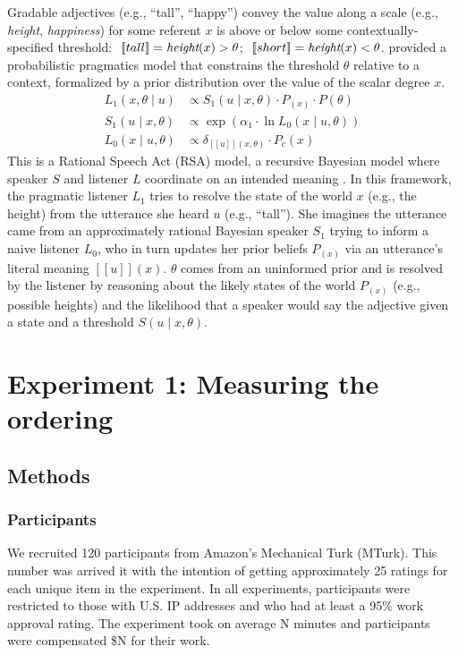 \documentclass[10pt,letterpaper]{article}
\newcommand{\denote}[1]{\mbox{ $[\![ #1 ]\!]$}}
\begin{document}
Gradable adjectives (e.g., ``tall'', ``happy'') convey the value along a scale (e.g., \emph{height}, \emph{happiness}) for some referent $x$ is above or below some contextually-specified threshold: $\denote{tall} = \emph{height}(x) > \theta$; $\denote{short} = \emph{height}(x) < \theta$.
 provided a probabilistic pragmatics model that constrains the threshold $\theta$ relative to a context, formalized by a prior distribution over the value of the scalar degree $x$.  
%
\begin{align}
L_{1}(x, \theta \mid u) &\propto S_{1}(u \mid x, \theta) \cdot P_(x) \cdot P(\theta) \label{eq:L1} \\
S_{1}(u \mid x, \theta) &\propto \exp{(\alpha_1 \cdot \ln {L_{0}(x \mid u, \theta)})} \label{eq:S1}\\
L_{0}(x \mid u, \theta) &\propto {\delta_{[\![u]\!](x, \theta)} \cdot P_{c}(x)} \label{eq:L0}
\end{align}
%
This is a Rational Speech Act (RSA) model, a recursive Bayesian model where speaker $S$ and listener $L$ coordinate on an intended meaning \cite<for a review, see >{Goodman2016:RSA}.
In this framework, the pragmatic listener $L_1$ tries to resolve the state of the world $x$ (e.g., the height) from the utterance she heard $u$ (e.g., ``tall'').
She imagines the utterance came from an approximately rational Bayesian speaker $S_1$ trying to inform a naive listener $L_0$, who in turn updates her prior beliefs $P_(x)$ via an utterance's literal meaning $[\![u]\!](x)$.
$\theta$ comes from an uninformed prior and is resolved by the listener by reasoning about the likely states of the world $P_(x)$ (e.g., possible heights) and the likelihood that a speaker would say the adjective given a state and a threshold $S(u \mid x, \theta)$.



\section{Experiment 1: Measuring the ordering}
\subsection{Methods}
\subsubsection{Participants}

We recruited 120 participants from Amazon's Mechanical Turk (MTurk). 
This number was arrived it with the intention of getting approximately 25 ratings for each unique item in the experiment.
In all experiments, participants were restricted to those with U.S. IP addresses and who had at least a 95\% work approval rating. 
The experiment took on average N minutes and participants were compensated \$N for their work.
\end{document}
